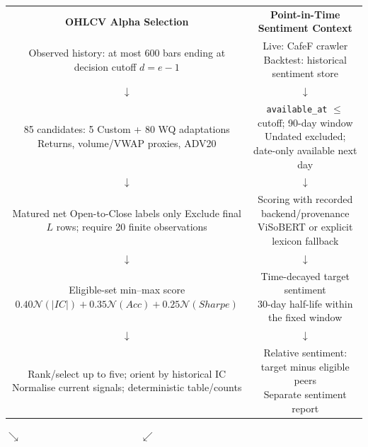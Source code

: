 \begingroup
\setlength{\tabcolsep}{7pt}
\newcommand{\alphabox}[1]{\fbox{\parbox[c][1.05cm][c]{0.40\textwidth}{\centering\scriptsize #1}}}
\begin{tabular}{cc}
\textbf{OHLCV Alpha Selection} & \textbf{Point-in-Time Sentiment Context} \\
\alphabox{Observed history: at most 600 bars\\ending at decision cutoff $d=e-1$} &
\alphabox{Live: CafeF crawler\\Backtest: historical sentiment store} \\
$\downarrow$ & $\downarrow$ \\
\alphabox{85 candidates: 5 Custom + 80 WQ adaptations\\Returns, volume/VWAP proxies, ADV20} &
\alphabox{\texttt{available\_at} $\leq$ cutoff; 90-day window\\Undated excluded; date-only available next day} \\
$\downarrow$ & $\downarrow$ \\
\alphabox{Matured net Open-to-Close labels only\\Exclude final $L$ rows; require 20 finite observations} &
\alphabox{Scoring with recorded backend/provenance\\ViSoBERT or explicit lexicon fallback} \\
$\downarrow$ & $\downarrow$ \\
\alphabox{Eligible-set min--max score\\$0.40\mathcal N(|IC|)+0.35\mathcal N(Acc)+0.25\mathcal N(Sharpe)$} &
\alphabox{Time-decayed target sentiment\\30-day half-life within the fixed window} \\
$\downarrow$ & $\downarrow$ \\
\alphabox{Rank/select up to five; orient by historical IC\\Normalise current signals; deterministic table/counts} &
\alphabox{Relative sentiment: target minus eligible peers\\Separate sentiment report} \\
\end{tabular}
\par\smallskip
$\searrow\qquad\qquad\qquad\qquad\qquad\qquad\swarrow$
\par\smallskip
{}
\endgroup
